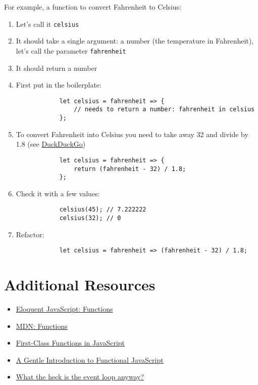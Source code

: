 For example, a function to convert Fahrenheit to Celsius:

\begin{enumerate}
    \item Let's call it \texttt{celsius}
    \item It should take a single argument: a number (the temperature in Fahrenheit), let's call the parameter \texttt{fahrenheit}
    \item It should return a number
    \item First put in the boilerplate:
        \begin{verbatim}
            let celsius = fahrenheit => {
                // needs to return a number: fahrenheit in celsius
            };
        \end{verbatim}
    \item To convert Fahrenheit into Celsius you need to take away 32 and divide by 1.8 (see \href{https://duckduckgo.com}{DuckDuckGo})
        \begin{verbatim}
            let celsius = fahrenheit => {
                return (fahrenheit - 32) / 1.8;
            };
        \end{verbatim}
    \item Check it with a few values:
        \begin{verbatim}
            celsius(45); // 7.222222
            celsius(32); // 0
        \end{verbatim}
    \item Refactor:
        \begin{verbatim}
            let celsius = fahrenheit => (fahrenheit - 32) / 1.8;
        \end{verbatim}
\end{enumerate}


\section{Additional Resources}

\begin{itemize}[leftmargin=*]
    \item \href{https://eloquentjavascript.net/03_functions.html}{Eloquent JavaScript: Functions}
    \item \href{https://developer.mozilla.org/en-US/docs/Web/JavaScript/Reference/Functions}{MDN: Functions}
    \item \href{https://nick.scialli.me/first-class-functions-in-javascript/}{First-Class Functions in JavaScript}
    \item \href{https://jrsinclair.com/articles/2016/gentle-introduction-to-functional-javascript-intro/}{A Gentle Introduction to Functional JavaScript}
    \item \href{https://www.youtube.com/watch?v=8aGhZQkoFbQ}{What the heck is the event loop anyway?}
\end{itemize}
